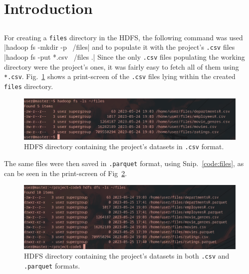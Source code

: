 \documentclass[12pt,twoside]{article}
\begin{document}



\section{Introduction}

\subsection{}
For creating a \texttt{files} directory in the HDFS, the following command was used
|hadoop fs -mkdir -p ~/files|
\noindent and to populate it with the project's \texttt{.csv} files
|hadoop fs -put *.csv ~/files .|
\noindent Since the only \texttt{.csv} files populating the working directory were the project's ones, it was fairly easy to fetch all of them using \texttt{*.csv}.
Fig.~\ref{fig:files} shows a print-screen of the \texttt{.csv} files lying within the created \texttt{files} directory.

\begin{figure}[htbp]
    \centering
    \includegraphics[width=\textwidth]{./figures/files.png}
    \caption{HDFS directory containing the project's datasets in \texttt{.csv} format.}
    \label{fig:files}
\end{figure}

The same files were then saved in \texttt{.parquet} format, using Snip.~\ref{code:files}, as can be seen in the print-screen of Fig~\ref{fig:files-all}.

\begin{figure}[htbp]
    \centering
    \includegraphics[width=\textwidth]{./figures/files-all.png}
    \caption{HDFS directory containing the project's datasets in both \texttt{.csv} and \texttt{.parquet} formats.}
    \label{fig:files-all}
\end{figure}
\end{document}
